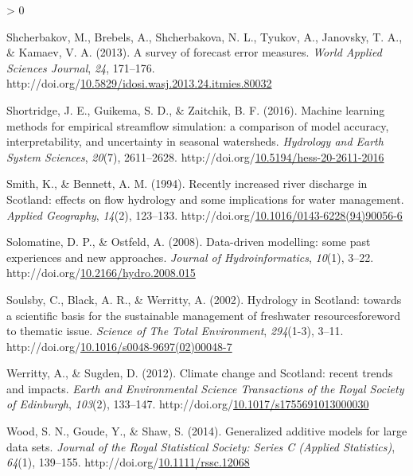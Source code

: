 \documentclass[12pt,oneside]{reedthesis}
\newlength{\cslhangindent}
\newenvironment{CSLReferences}[2] %
 {%
  \setlength{\parindent}{0pt}
  \ifodd #1 \everypar{\setlength{\hangindent}{\cslhangindent}}\ignorespaces\fi
  \ifnum #2 > 0
  \setlength{\parskip}{#2\baselineskip}
  \fi
 }%
 {}
\begin{document}
\begin{CSLReferences}{1}{0}
\leavevmode\hypertarget{ref-Maxim2013}{}%
Shcherbakov, M., Brebels, A., Shcherbakova, N. L., Tyukov, A., Janovsky, T. A., \& Kamaev, V. A. (2013). A survey of forecast error measures. \emph{World Applied Sciences Journal}, \emph{24}, 171--176. http://doi.org/\href{https://doi.org/10.5829/idosi.wasj.2013.24.itmies.80032}{10.5829/idosi.wasj.2013.24.itmies.80032}

\leavevmode\hypertarget{ref-shortridge2016}{}%
Shortridge, J. E., Guikema, S. D., \& Zaitchik, B. F. (2016). Machine learning methods for empirical streamflow simulation: a comparison of model accuracy, interpretability, and uncertainty in seasonal watersheds. \emph{Hydrology and Earth System Sciences}, \emph{20}(7), 2611--2628. http://doi.org/\href{https://doi.org/10.5194/hess-20-2611-2016}{10.5194/hess-20-2611-2016}

\leavevmode\hypertarget{ref-smith1994}{}%
Smith, K., \& Bennett, A. M. (1994). Recently increased river discharge in Scotland: effects on flow hydrology and some implications for water management. \emph{Applied Geography}, \emph{14}(2), 123--133. http://doi.org/\href{https://doi.org/10.1016/0143-6228(94)90056-6}{10.1016/0143-6228(94)90056-6}

\leavevmode\hypertarget{ref-solomatine2008}{}%
Solomatine, D. P., \& Ostfeld, A. (2008). Data-driven modelling: some past experiences and new approaches. \emph{Journal of Hydroinformatics}, \emph{10}(1), 3--22. http://doi.org/\href{https://doi.org/10.2166/hydro.2008.015}{10.2166/hydro.2008.015}

\leavevmode\hypertarget{ref-soulsby2002}{}%
Soulsby, C., Black, A. R., \& Werritty, A. (2002). Hydrology in Scotland: towards a scientific basis for the sustainable management of freshwater resources{{}}foreword to thematic issue. \emph{Science of The Total Environment}, \emph{294}(1-3), 3--11. http://doi.org/\href{https://doi.org/10.1016/s0048-9697(02)00048-7}{10.1016/s0048-9697(02)00048-7}

\leavevmode\hypertarget{ref-werritty2012}{}%
Werritty, A., \& Sugden, D. (2012). Climate change and Scotland: recent trends and impacts. \emph{Earth and Environmental Science Transactions of the Royal Society of Edinburgh}, \emph{103}(2), 133--147. http://doi.org/\href{https://doi.org/10.1017/s1755691013000030}{10.1017/s1755691013000030}

\leavevmode\hypertarget{ref-wood2014}{}%
Wood, S. N., Goude, Y., \& Shaw, S. (2014). Generalized additive models for large data sets. \emph{Journal of the Royal Statistical Society: Series C (Applied Statistics)}, \emph{64}(1), 139--155. http://doi.org/\href{https://doi.org/10.1111/rssc.12068}{10.1111/rssc.12068}


\end{CSLReferences}
\end{document}
